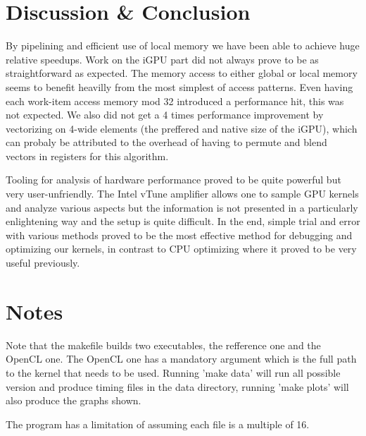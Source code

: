\section{Discussion \& Conclusion}
By pipelining and efficient use of local memory we have been able to achieve huge relative speedups. Work on the iGPU part did not always prove to be
as straightforward as expected. The memory access to either global or local memory seems to benefit heavilly from the most simplest of access patterns. Even having each work-item access
memory mod 32 introduced a performance hit, this was not expected. We also did not get a 4 times performance improvement by vectorizing on 4-wide elements (the preffered and native size of the
iGPU), which can probaly be attributed to the overhead of having to permute and blend vectors in registers for this algorithm.
\par Tooling for analysis of hardware performance proved to be quite powerful but very user-unfriendly. The Intel vTune amplifier allows one to sample GPU kernels and analyze various aspects but the information is
not presented in a particularly enlightening way and the setup is quite difficult. In the end, simple trial and error with various methods proved to be the most effective method for debugging and optimizing our kernels, in contrast to CPU optimizing where it proved to be very useful previously.

\section{Notes}
\par Note that the makefile builds two executables, the refference one and the OpenCL one. The OpenCL one has a mandatory argument which is the full path to the kernel that needs to be used.
Running 'make data' will run all possible version and produce timing files in the data directory, running 'make plots' will also produce the graphs shown.
\par The program has a limitation of assuming each file is a multiple of 16.


